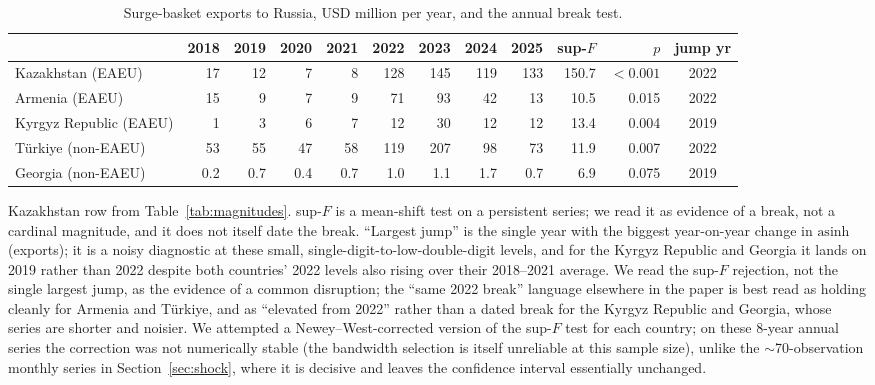 \documentclass[12pt]{article}
\begin{document}
\begin{table}[htbp]
\centering
\caption{Surge-basket exports to Russia, USD million per year, and the annual break test.}
\label{tab:appe}
\footnotesize
\setlength{\tabcolsep}{3.2pt}
\begin{tabular}{@{}lrrrrrrrrrrc@{}}
\toprule
& 2018 & 2019 & 2020 & 2021 & 2022 & 2023 & 2024 & 2025 & sup-$F$ & $p$ & jump yr \\
\midrule
Kazakhstan (EAEU)        & 17 & 12 & 7 & 8 & 128 & 145 & 119 & 133 & 150.7 & $<0.001$ & 2022 \\
Armenia (EAEU)           & 15 & 9 & 7 & 9 & 71 & 93 & 42 & 13 & 10.5 & 0.015 & 2022 \\
Kyrgyz Republic (EAEU)   & 1 & 3 & 6 & 7 & 12 & 30 & 12 & 12 & 13.4 & 0.004 & 2019 \\
T\"urkiye (non-EAEU)     & 53 & 55 & 47 & 58 & 119 & 207 & 98 & 73 & 11.9 & 0.007 & 2022 \\
Georgia (non-EAEU)       & 0.2 & 0.7 & 0.4 & 0.7 & 1.0 & 1.1 & 1.7 & 0.7 & 6.9 & 0.075 & 2019 \\
\bottomrule
\end{tabular}

\vspace{2pt}
\footnotesize Kazakhstan row from Table~\ref{tab:magnitudes}. sup-$F$ is a mean-shift test on
a persistent series; we read it as evidence of a break, not a cardinal magnitude, and it does
not itself date the break. ``Largest jump'' is the single year with the biggest
year-on-year change in $\text{asinh}$(exports); it is a noisy diagnostic at these small,
single-digit-to-low-double-digit levels, and for the Kyrgyz Republic and Georgia it lands on
2019 rather than 2022 despite both countries' 2022 levels also rising over their 2018--2021
average. We read the sup-$F$ rejection, not the single
largest jump, as the evidence of a common disruption; the ``same 2022 break'' language
elsewhere in the paper is best read as holding cleanly for Armenia and T\"urkiye, and as
``elevated from 2022'' rather than a dated break for the Kyrgyz Republic and Georgia,
whose series are shorter and noisier. We attempted
a Newey--West-corrected version of the sup-$F$ test for each country; on these 8-year annual series
the correction was not numerically stable (the bandwidth selection is itself unreliable at
this sample size), unlike the $\sim$70-observation monthly series in
Section~\ref{sec:shock}, where it is decisive and leaves the confidence interval essentially
unchanged.
\end{table}
\end{document}
